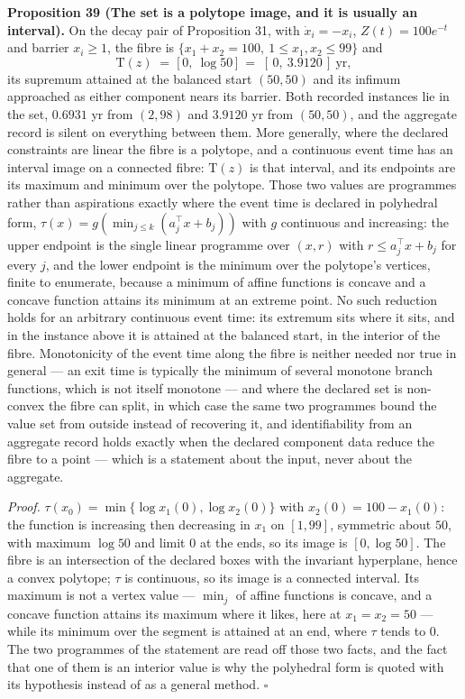 \documentclass[11pt]{article}
\begin{document}
\textbf{Proposition 39 (The set is a polytope image, and it is usually an interval).} On the decay pair of
Proposition 31, with \(\dot x_i = -x_i\), \(Z(t) = 100 e^{-t}\) and barrier \(x_i \ge 1\), the fibre is
\(\{x_1 + x_2 = 100,\ 1 \le x_1, x_2 \le 99\}\) and
\[
\mathrm T(z) \;=\; \bigl[\,0,\ \log 50\,\bigr] \;=\; [\,0,\ 3.9120\,] \ \text{yr},
\]
its supremum attained at the balanced start \((50, 50)\) and its infimum approached as either component
nears its barrier. Both recorded instances lie in the set, \(0.6931\) yr from \((2, 98)\) and \(3.9120\) yr
from \((50, 50)\), and the aggregate record is silent on everything between them. More generally, where the declared constraints are linear the fibre is a polytope, and a continuous
event time has an interval image on a connected fibre: \(\mathrm T(z)\) is that interval, and its endpoints
are its maximum and minimum over the polytope. Those two values are programmes rather than aspirations
exactly where the event time is declared in polyhedral form, \(\tau(x) = g(\min_{j \le k}(a_j^{\top} x + b_j))\)
with \(g\) continuous and increasing: the upper endpoint is the single linear programme over \((x, r)\) with
\(r \le a_j^{\top} x + b_j\) for every \(j\), and the lower endpoint is the minimum over the polytope's vertices,
finite to enumerate, because a minimum of affine functions is concave and a concave function attains its
minimum at an extreme point. No such reduction holds for an arbitrary continuous event time: its extremum sits
where it sits, and in the instance above it is attained at the balanced start, in the interior of the fibre. Monotonicity of the event time along the fibre
is neither needed nor true in general --- an exit time is typically the minimum of several monotone branch
functions, which is not itself monotone --- and where the declared set is non-convex the fibre can split,
in which case the same two programmes bound the value set from outside instead of recovering it, and identifiability from an aggregate record holds exactly when the declared
component data reduce the fibre to a point --- which is a statement about the input, never about the
aggregate.

\emph{Proof.} \(\tau(x_0) = \min\{\log x_1(0), \log x_2(0)\}\) with \(x_2(0) = 100 - x_1(0)\): the function is
increasing then decreasing in \(x_1\) on \([1, 99]\), symmetric about \(50\), with maximum \(\log 50\) and
limit \(0\) at the ends, so its image is \([0, \log 50]\). The fibre is an intersection of the declared
boxes with the invariant hyperplane, hence a convex polytope; \(\tau\) is continuous, so its image is a
connected interval. Its maximum is not a vertex value --- \(\min_j\) of affine functions is concave, and a
concave function attains its maximum where it likes, here at \(x_1 = x_2 = 50\) --- while its minimum over the
segment is attained at an end, where \(\tau\) tends to \(0\). The two programmes of the statement are read off
those two facts, and the fact that one of them is an interior value is why the polyhedral form is quoted with
its hypothesis instead of as a general method. \ensuremath{\square}
\end{document}
